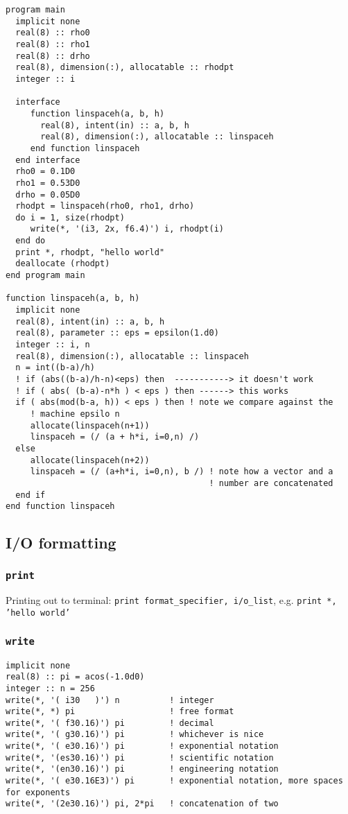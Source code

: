 \documentclass[11pt]{article}
\begin{document}
\begin{verbatim}
program main
  implicit none
  real(8) :: rho0
  real(8) :: rho1
  real(8) :: drho
  real(8), dimension(:), allocatable :: rhodpt
  integer :: i

  interface
     function linspaceh(a, b, h)
       real(8), intent(in) :: a, b, h
       real(8), dimension(:), allocatable :: linspaceh
     end function linspaceh
  end interface
  rho0 = 0.1D0
  rho1 = 0.53D0
  drho = 0.05D0
  rhodpt = linspaceh(rho0, rho1, drho)
  do i = 1, size(rhodpt)
     write(*, '(i3, 2x, f6.4)') i, rhodpt(i)
  end do
  print *, rhodpt, "hello world"
  deallocate (rhodpt)
end program main

function linspaceh(a, b, h)
  implicit none
  real(8), intent(in) :: a, b, h
  real(8), parameter :: eps = epsilon(1.d0)
  integer :: i, n
  real(8), dimension(:), allocatable :: linspaceh
  n = int((b-a)/h)
  ! if (abs((b-a)/h-n)<eps) then  -----------> it doesn't work
  ! if ( abs( (b-a)-n*h ) < eps ) then ------> this works
  if ( abs(mod(b-a, h)) < eps ) then ! note we compare against the
     ! machine epsilo n
     allocate(linspaceh(n+1))
     linspaceh = (/ (a + h*i, i=0,n) /)
  else
     allocate(linspaceh(n+2))
     linspaceh = (/ (a+h*i, i=0,n), b /) ! note how a vector and a
                                         ! number are concatenated
  end if
end function linspaceh
\end{verbatim}

\subsection{I/O formatting}
\label{sec:org9cdbc28}
\subsubsection{\texttt{print}}
\label{sec:orgbc969e9}
Printing out to terminal: \texttt{print format\_specifier, i/o\_list},
e.g. \texttt{print *, 'hello world'}
\subsubsection{\texttt{write}}
\label{sec:org98ef15c}
\begin{verbatim}
implicit none
real(8) :: pi = acos(-1.0d0)
integer :: n = 256
write(*, '( i30   )') n          ! integer
write(*, *) pi                   ! free format
write(*, '( f30.16)') pi         ! decimal
write(*, '( g30.16)') pi         ! whichever is nice
write(*, '( e30.16)') pi         ! exponential notation
write(*, '(es30.16)') pi         ! scientific notation
write(*, '(en30.16)') pi         ! engineering notation
write(*, '( e30.16E3)') pi       ! exponential notation, more spaces for exponents
write(*, '(2e30.16)') pi, 2*pi   ! concatenation of two
\end{verbatim}
\end{document}
